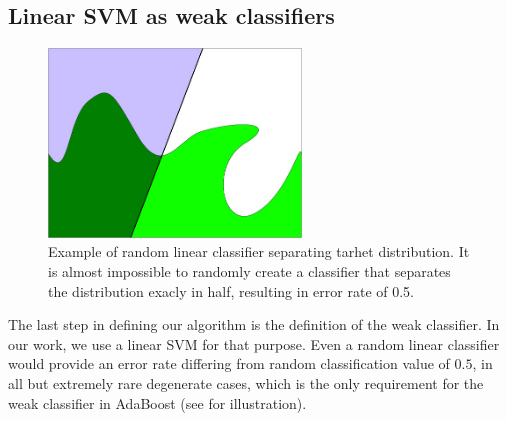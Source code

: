 \subsection{Linear SVM as weak classifiers}
\begin{figure}[t]
		\centering
		\includegraphics[width=0.6\textwidth]{linearsample2}
		\caption[Example of a random linear classifier]{Example of random linear classifier separating tarhet distribution. It is almost impossible to randomly create a classifier that separates the distribution exacly in half, resulting in error rate of 0.5.}
		\label{linsam}
	\end{figure}
The last step in defining our algorithm is the definition of the weak classifier. In our work, we use a linear SVM for that purpose. Even a random linear classifier would provide an error rate differing from random classification value of $0.5$, in all but extremely rare degenerate cases, which is the only requirement for the weak classifier in AdaBoost (see  for illustration).

